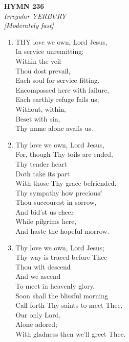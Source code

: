 \newpage
\begin{center}
    {\Large \textbf{HYMN 236}}
    \\
    \textit{Irregular YERBURY}
    \\
    \textit{\small [Moderately fast]}
\end{center}
\vspace{1em}

\begin{enumerate}
    \item THY love we own, Lord Jesus, \\
        In service unremitting; \\
            Within the veil \\
            Thou dost prevail, \\
        Each soul for service fitting. \\
        Encompassed here with failure, \\
        Each earthly refuge fails us; \\
            Without, within, \\
            Beset with sin, \\
        Thy name alone avails us.

    \item Thy love we own, Lord Jesus, \\
        For, though Thy toils are ended, \\
            Thy tender heart \\
            Doth take its part \\
        With those Thy grace befriended. \\
        Thy sympathy how precious! \\
        Thou succourest in sorrow, \\
            And bid'st us cheer \\
            While pilgrims here, \\
        And haste the hopeful morrow.

    \item Thy love we own, Lord Jesus; \\
        Thy way is traced before Thee--- \\
            Thou wilt descend \\
            And we ascend \\
        To meet in heavenly glory. \\
        Soon shall the blissful morning \\
        Call forth Thy saints to meet Thee, \\
            Our only Lord, \\
            Alone adored; \\
        With gladness then we'll greet Thee.


\end{enumerate}
